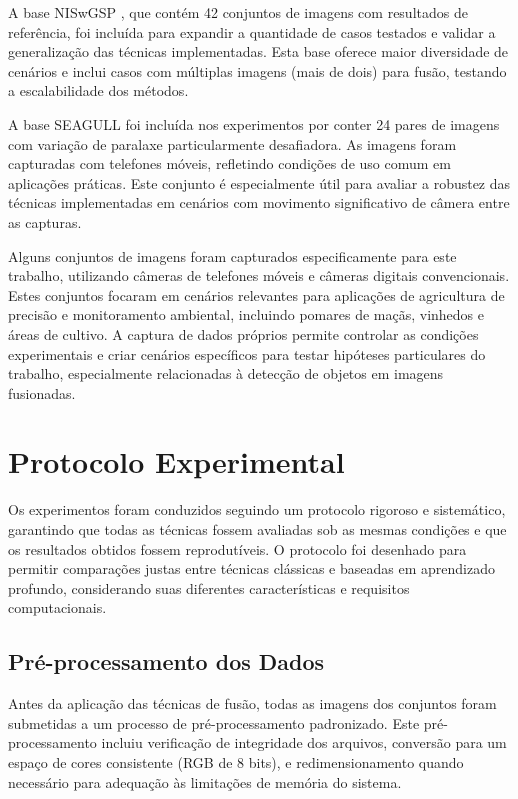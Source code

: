 A base NISwGSP \cite{chen2016natural}, que contém 42 conjuntos de imagens com resultados de referência, foi incluída para expandir a quantidade de casos testados e validar a generalização das técnicas implementadas. Esta base oferece maior diversidade de cenários e inclui casos com múltiplas imagens (mais de dois) para fusão, testando a escalabilidade dos métodos.

A base SEAGULL \cite{lin2016seagull} foi incluída nos experimentos por conter 24 pares de imagens com variação de paralaxe particularmente desafiadora. As imagens foram capturadas com telefones móveis, refletindo condições de uso comum em aplicações práticas. Este conjunto é especialmente útil para avaliar a robustez das técnicas implementadas em cenários com movimento significativo de câmera entre as capturas.

Alguns conjuntos de imagens foram capturados especificamente para este trabalho, utilizando câmeras de telefones móveis e câmeras digitais convencionais. Estes conjuntos focaram em cenários relevantes para aplicações de agricultura de precisão e monitoramento ambiental, incluindo pomares de maçãs, vinhedos e áreas de cultivo. A captura de dados próprios permite controlar as condições experimentais e criar cenários específicos para testar hipóteses particulares do trabalho, especialmente relacionadas à detecção de objetos em imagens fusionadas.

\section{Protocolo Experimental}

Os experimentos foram conduzidos seguindo um protocolo rigoroso e sistemático, garantindo que todas as técnicas fossem avaliadas sob as mesmas condições e que os resultados obtidos fossem reprodutíveis. O protocolo foi desenhado para permitir comparações justas entre técnicas clássicas e baseadas em aprendizado profundo, considerando suas diferentes características e requisitos computacionais.

\subsection{Pré-processamento dos Dados}

Antes da aplicação das técnicas de fusão, todas as imagens dos conjuntos foram submetidas a um processo de pré-processamento padronizado. Este pré-processamento incluiu verificação de integridade dos arquivos, conversão para um espaço de cores consistente (RGB de 8 bits), e redimensionamento quando necessário para adequação às limitações de memória do sistema.

